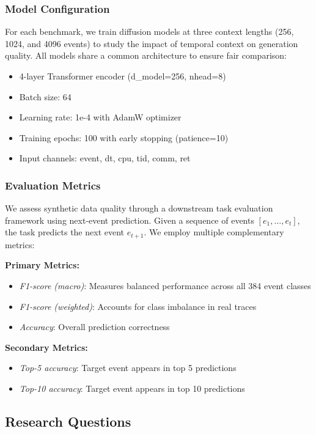 \subsubsection{Model Configuration}
For each benchmark, we train diffusion models at three context lengths (256, 1024, and 4096 events) to study the impact of temporal context on generation quality. All models share a common architecture to ensure fair comparison:

\begin{itemize}
    \item 4-layer Transformer encoder (d\_model=256, nhead=8)
    \item Batch size: 64
    \item Learning rate: 1e-4 with AdamW optimizer
    \item Training epochs: 100 with early stopping (patience=10)
    \item Input channels: event, dt, cpu, tid, comm, ret
\end{itemize}

\subsubsection{Evaluation Metrics}
We assess synthetic data quality through a downstream task evaluation framework using next-event prediction. Given a sequence of events \([e_1, \ldots, e_t]\), the task predicts the next event \(e_{t+1}\). We employ multiple complementary metrics:

\textbf{Primary Metrics:}
\begin{itemize}
    \item \textit{F1-score (macro)}: Measures balanced performance across all 384 event classes
    \item \textit{F1-score (weighted)}: Accounts for class imbalance in real traces
    \item \textit{Accuracy}: Overall prediction correctness
\end{itemize}

\textbf{Secondary Metrics:}
\begin{itemize}
    \item \textit{Top-5 accuracy}: Target event appears in top 5 predictions
    \item \textit{Top-10 accuracy}: Target event appears in top 10 predictions
\end{itemize}

\subsection{Research Questions}
\label{subsec:rqs}

